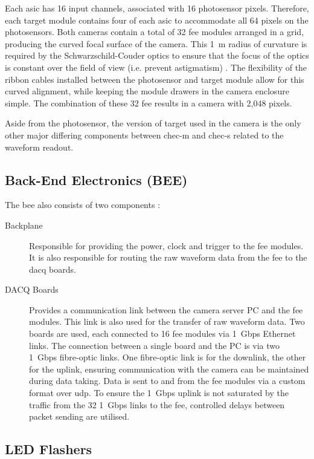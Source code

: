 Each \gls{asic} has 16 input channels, associated with 16 photosensor pixels. Therefore, each \gls{target} module contains four of each \gls{asic} to accommodate all 64 pixels on the photosensors. Both cameras contain a total of 32 \gls{fee} modules arranged in a grid, producing the curved focal surface of the camera. This \SI{1}{m} radius of curvature is required by the Schwarzschild-Couder optics to ensure that the focus of the optics is constant over the field of view (i.e. prevent astigmatism) \cite{Vassiliev2007}. The flexibility of the ribbon cables installed between the photosensor and \gls{target} module allow for this curved alignment, while keeping the module drawers in the camera enclosure simple. The combination of these 32 \gls{fee} results in a camera with 2,048 pixels.

Aside from the photosensor, the version of \gls{target} used in the camera is the only other major differing components between \gls{chec-m} and \gls{chec-s} related to the waveform readout. 

\subsection{Back-End Electronics (BEE)} \label{section:bee}

The \gls{bee} also consists of two components \cite{Zorn2017}:
\begin{description}
\item [Backplane] Responsible for providing the power, clock and trigger to the \gls{fee} modules. It is also responsible for routing the raw waveform data from the \gls{fee} to the \gls{dacq} boards. 
\item [DACQ Boards] Provides a communication link between the camera server PC and the \gls{fee} modules. This link is also used for the transfer of raw waveform data. Two boards are used, each connected to 16 \gls{fee} modules via \SI{1}{Gbps} Ethernet links. The connection between a single board and the PC is via two \SI{1}{Gbps} fibre-optic links. One fibre-optic link is for the downlink, the other for the uplink, ensuring communication with the camera can be maintained during data taking. Data is sent to and from the \gls{fee} modules via a custom format over \gls{udp}. To ensure the \SI{1}{Gbps} uplink is not saturated by the traffic from the 32 \SI{1}{Gbps} links to the \gls{fee}, controlled delays between packet sending are utilised.
\end{description}

\subsection{LED Flashers} \label{section:led_flashers}

